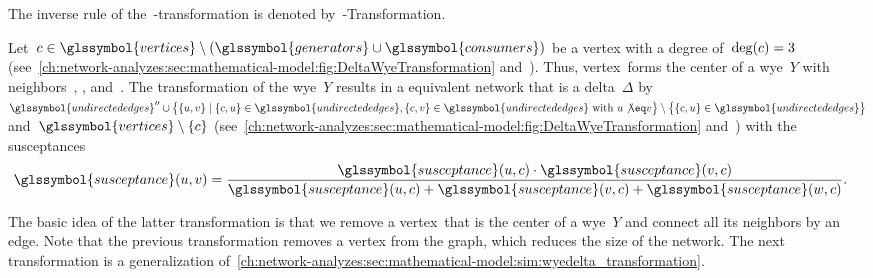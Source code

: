 % 
The inverse rule of the~\deltawye-transformation is denoted
by~\wyedelta-Transformation.
% 
\begin{reductionrule}
    Let~$
        \vertexStar
        \in
        \glssymbol{vertices}
        \setminus
        (\glssymbol{generators}\cup\glssymbol{consumers})
    $ be a vertex with a degree of~$\operatorname{deg}(c) = 3$
    (see~\cref{ch:network-analyzes:sec:mathematical-model:fig:DeltaWyeTransformation}
    and~). Thus, vertex~\vertexStar forms the center of a wye~$Y$ with
    neighbors~\vertexa, \vertexb, and~\vertexc. The transformation of the
    wye~$Y$ results in a equivalent network that is a delta~$\Delta$ by~$
        \glssymbol{undirectededges}''
        \cup
        \big\{
            \{\vertexa,\vertexb\}
            \mid
            \{\vertexStar,\vertexa\}
            \in
            \glssymbol{undirectededges},
            \{\vertexStar,\vertexb\}
            \in
            \glssymbol{undirectededges}~\text{with}~\vertexa
            \not\eq
            \vertexb
        \big\}
        \setminus
        \big\{
            \{\vertexStar,\vertexa\}
            \in
            \glssymbol{undirectededges}
        \big\}
    $ and~$
        \glssymbol{vertices}
        \setminus
        \{\vertexStar\}
    $
    (see~\cref{ch:network-analyzes:sec:mathematical-model:fig:DeltaWyeTransformation}%
     and~) with the susceptances
    \begin{align}
        \glssymbol{susceptance}(\vertexa,\vertexb) 
        &= 
        \frac{
            \glssymbol{susceptance}(\vertexa,\vertexStar)
            \cdot
            \glssymbol{susceptance}(\vertexb,\vertexStar)
        }{
            \glssymbol{susceptance}(\vertexa,\vertexStar) 
            + 
            \glssymbol{susceptance}(\vertexb,\vertexStar) 
            + 
            \glssymbol{susceptance}(\vertexc,\vertexStar)
        }.
    \end{align}
    \label{ch:network-analyzes:sec:mathematical-model:sim:wyedelta_transformation}
\end{reductionrule}
% 
The basic idea of the latter transformation is that we remove a
vertex~\vertexStar that is the center of a wye~$Y$ and connect all its neighbors
by an edge. Note that the previous transformation removes a vertex from the
graph, which reduces the size of the network. The next transformation is a
generalization
of~\cref{ch:network-analyzes:sec:mathematical-model:sim:wyedelta_transformation}.

